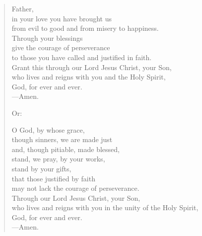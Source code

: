 \prayer

\setlength{\leftmargini}{\prayerleftmargini}

\begin{verse}
Father,\\
in your love you have brought us\\
from evil to good and from misery to happiness.\\
Through your blessings\\
give the courage of perseverance\\
to those you have called and justified in faith.\\
Grant this through our Lord Jesus Christ, your Son,\\
who lives and reigns with you and the Holy Spirit,\\
God, for ever and ever.\\
{\color{red}---\thinspace}Amen.

{\color{red}Or:}

O God, by whose grace,\\
though sinners, we are made just\\
and, though pitiable, made blessed,\\
stand, we pray, by your works,\\
stand by your gifts,\\
that those justified by faith\\
may not lack the courage of perseverance.\\
Through our Lord Jesus Christ, your Son,\\
who lives and reigns with you in the unity of the Holy Spirit,\\
God, for ever and ever.\\
{\color{red}---\thinspace}Amen.
\end{verse}

\setlength{\leftmargini}{\defleftmargini}